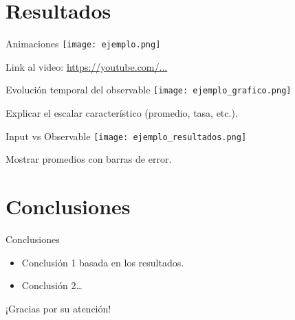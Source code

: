 \documentclass{beamer}
\begin{document}
\section{Resultados}
\begin{frame}{Animaciones}
  \texttt{[image: ejemplo.png]}
  
  \vspace{0.3cm}
  \footnotesize Link al video: \url{https://youtube.com/...}
\end{frame}

\begin{frame}{Evolución temporal del observable}
  \texttt{[image: ejemplo\_grafico.png]}
  
  \vspace{0.3cm}
  Explicar el escalar característico (promedio, tasa, etc.).
\end{frame}

\begin{frame}{Input vs Observable}
  \texttt{[image: ejemplo\_resultados.png]}
  
  \vspace{0.3cm}
  Mostrar promedios con barras de error.
\end{frame}

\section{Conclusiones}
\begin{frame}{Conclusiones}
  \begin{itemize}
    \item Conclusión 1 basada en los resultados.
    \item Conclusión 2…
  \end{itemize}
\end{frame}

\begin{frame}{}
  \centering
  \Huge ¡Gracias por su atención!
\end{frame}
\end{document}
